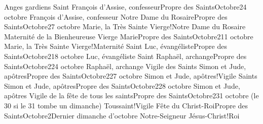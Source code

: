 \documentclass[twoside, french]{book}
\begin{document}
        {}{}{Anges gardiens}{}{}
        {Saint François d’Assise, confesseur}{Propre des Saints}{Octobre}{2}{4 octobre}
        {}{}{François d’Assise, confesseur}{}{}
        {Notre Dame du Rosaire}{Propre des Saints}{Octobre}{2}{7 octobre}
        {}{}{Marie, la Très Sainte Vierge!Notre Dame du Rosaire}{}{}
        {Maternité de la Bienheureuse Vierge Marie}{Propre des Saints}{Octobre}{2}{11 octobre}
        {}{}{Marie, la Très Sainte Vierge!Maternité}{}{}
        {Saint Luc, évangéliste}{Propre des Saints}{Octobre}{2}{18 octobre}
        {}{}{Luc, évangéliste}{}{}
        {Saint Raphaël, archange}{Propre des Saints}{Octobre}{2}{24 octobre}
        {}{}{Raphaël, archange}{}{}
        {Vigile des Saints Simon et Jude, apôtres}{Propre des Saints}{Octobre}{2}{27 octobre}
        {}{}{Simon et Jude, apôtres!Vigile}{}{}
        {Saints Simon et Jude, apôtres}{Propre des Saints}{Octobre}{2}{28 octobre}
        {}{}{Simon et Jude, apôtres}{}{}
        {Vigile de la fête de tous les saints}{Propre des Saints}{Octobre}{2}{31 octobre (le 30 si le 31 tombe un dimanche)}
        {}{}{Toussaint!Vigile}{}{}
        {Fête du Christ-Roi}{Propre des Saints}{Octobre}{2}{Dernier dimanche d’octobre}
        {}{}{Notre-Seigneur Jésus-Christ!Roi}{}{}
\end{document}
